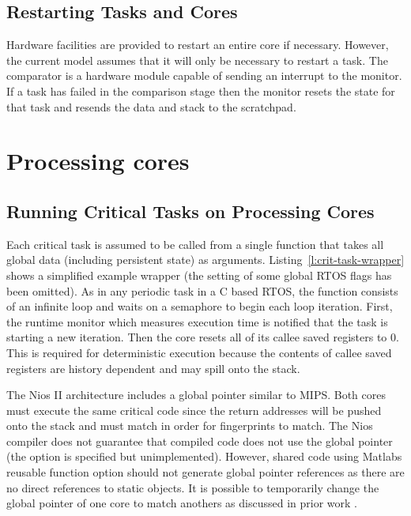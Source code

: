 \subsection{Restarting Tasks and Cores}

	Hardware facilities are provided to restart an entire core if necessary. 
	However, the current model assumes that it will only be necessary to restart a task.
	The comparator is a hardware module capable of sending an interrupt to the monitor. 
	If a task has failed in the comparison stage then the monitor resets the state for that task and resends the data and stack to the scratchpad.



\section{Processing cores}
\label{s:proc-cores}
\subsection{Running Critical Tasks on Processing Cores}

	Each critical task is assumed to be called from a single function that takes all global data (including persistent state) as arguments. 
	Listing~\ref{l:crit-task-wrapper} shows a simplified example wrapper (the setting of some global RTOS flags has been omitted). 
	As in any periodic task in a C based RTOS, the function consists of an infinite loop and waits on a semaphore to begin each loop iteration. 
	First, the runtime monitor which measures execution time is notified that the task is starting a new iteration. 
	Then the core resets all of its callee saved registers to 0. 
	This is required for deterministic execution because the contents of callee saved registers are history dependent and may spill onto the stack. 


	The Nios II architecture includes a global pointer similar to MIPS. 
	Both cores must execute the same critical code since the return addresses will be pushed onto the stack and must match in order for fingerprints to match. 
	The Nios compiler does not guarantee that compiled code does not use the global pointer (the option is specified but unimplemented). 
	However, shared code using Matlabs reusable function option should not generate global pointer references as there are no direct references to static objects. 
	It is possible to temporarily change the global pointer of one core to match anothers as discussed in prior work \cite{ugthesis}.


